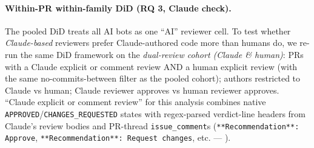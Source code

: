 \paragraph{Within-PR within-family DiD (RQ 3, Claude check).} The pooled DiD treats all AI bots as one ``AI'' reviewer cell. To test whether \emph{Claude-based} reviewers prefer Claude-authored code more than humans do, we re-run the same DiD framework on the \emph{dual-review cohort (Claude \& human)}: PRs with a Claude explicit or comment review AND a human explicit review (with the same no-commits-between filter as the pooled cohort); authors restricted to Claude vs human; Claude reviewer approves vs human reviewer approves. ``Claude explicit or comment review'' for this analysis combines native \texttt{APPROVED}/\texttt{CHANGES\_REQUESTED} states with regex-parsed verdict-line headers from Claude's review bodies and PR-thread \texttt{issue\_comment}s (\texttt{**Recommendation**: Approve}, \texttt{**Recommendation**: Request changes}, etc. --- ).
